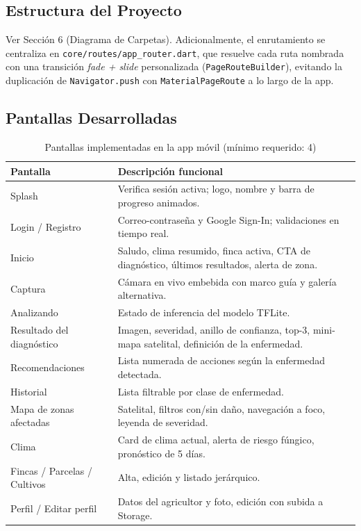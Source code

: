 \documentclass[12pt,a4paper]{article}
\begin{document}
\subsection{Estructura del Proyecto}

Ver Sección 6 (Diagrama de Carpetas). Adicionalmente, el enrutamiento se
centraliza en \texttt{core/routes/app\_router.dart}, que resuelve cada ruta
nombrada con una transición \textit{fade + slide} personalizada
(\texttt{PageRouteBuilder}), evitando la duplicación de \texttt{Navigator.push}
con \texttt{MaterialPageRoute} a lo largo de la app.

\subsection{Pantallas Desarrolladas}

\begin{table}[H]
\centering
\caption{Pantallas implementadas en la app móvil (mínimo requerido: 4)}
\label{tab:pantallas}
\renewcommand{\arraystretch}{1.3}
\begin{tabular}{p{4.5cm} p{8.5cm}}
\toprule
\bfseries Pantalla & \bfseries Descripción funcional \\
\midrule
Splash                  & Verifica sesión activa; logo, nombre y barra de progreso animados. \\
Login / Registro        & Correo-contraseña y Google Sign-In; validaciones en tiempo real. \\
Inicio                  & Saludo, clima resumido, finca activa, CTA de diagnóstico, últimos resultados, alerta de zona. \\
Captura                 & Cámara en vivo embebida con marco guía y galería alternativa. \\
Analizando              & Estado de inferencia del modelo TFLite. \\
Resultado del diagnóstico & Imagen, severidad, anillo de confianza, top-3, mini-mapa satelital, definición de la enfermedad. \\
Recomendaciones          & Lista numerada de acciones según la enfermedad detectada. \\
Historial                & Lista filtrable por clase de enfermedad. \\
Mapa de zonas afectadas   & Satelital, filtros con/sin daño, navegación a foco, leyenda de severidad. \\
Clima                    & Card de clima actual, alerta de riesgo fúngico, pronóstico de 5 días. \\
Fincas / Parcelas / Cultivos & Alta, edición y listado jerárquico. \\
Perfil / Editar perfil    & Datos del agricultor y foto, edición con subida a Storage. \\
\bottomrule
\end{tabular}
\end{table}
\end{document}
